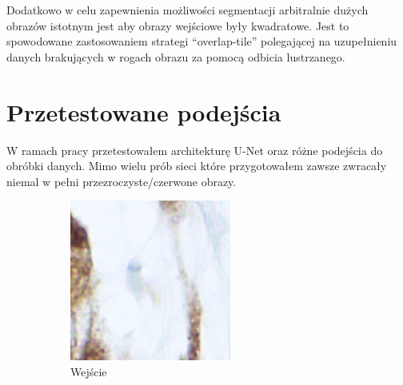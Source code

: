 \documentclass{article}
\begin{document}
Dodatkowo w celu zapewnienia możliwości segmentacji arbitralnie dużych obrazów istotnym jest aby obrazy wejściowe były kwadratowe. Jest to spowodowane zastosowaniem strategi ``overlap-tile'' polegającej na uzupełnieniu danych brakujących w rogach obrazu za pomocą odbicia lustrzanego.
\newpage
\section{Przetestowane podejścia}
W ramach pracy przetestowałem architekturę U-Net oraz różne podejścia do obróbki danych.
Mimo wielu prób sieci które przygotowałem zawsze zwracały niemal w pełni przezroczyste/czerwone obrazy.
\begin{figure}[H]
    \centering
    \begin{subfigure}{0.4\linewidth}
        \includegraphics[width=\linewidth]{images/0_0_0.png}
        \caption{Wejście}
    \end{subfigure}
    \begin{subfigure}{0.4\linewidth}

\end{subfigure}
\end{figure}
\end{document}
